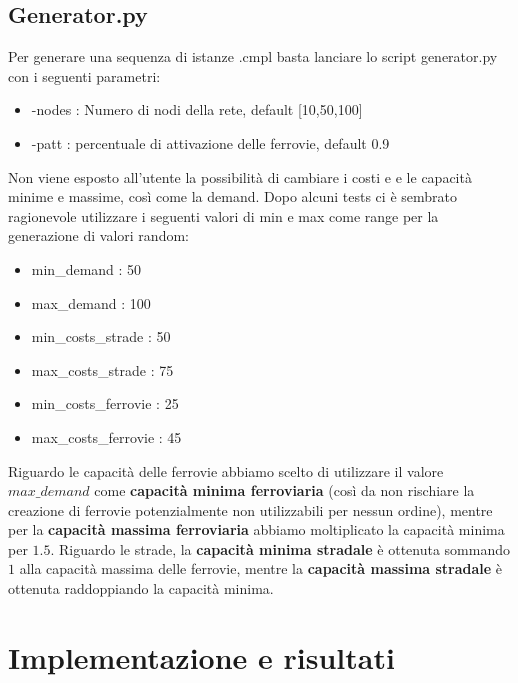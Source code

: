 \documentclass{article}
\begin{document}
\subsection{Generator.py}
Per generare una sequenza di istanze .cmpl basta lanciare lo script generator.py con i seguenti parametri:

\begin{itemize}
    \item -nodes : Numero di nodi della rete, default [10,50,100]
    \item -patt : percentuale di attivazione delle ferrovie, default 0.9
\end{itemize}
Non viene esposto all'utente la possibilità di cambiare i costi e e le capacità minime e massime, così come la demand. Dopo alcuni tests ci è sembrato ragionevole utilizzare i seguenti valori di min e max come range per la generazione di valori random:
\begin{itemize}
    \item min\_demand : 50
    \item max\_demand : 100
    \item min\_costs\_strade : 50
    \item max\_costs\_strade : 75
    \item min\_costs\_ferrovie : 25
    \item max\_costs\_ferrovie : 45
\end{itemize}

Riguardo le capacità delle ferrovie abbiamo scelto di utilizzare il valore $max\_demand$ come \textbf{capacità minima ferroviaria} (così da non rischiare la creazione di ferrovie potenzialmente non utilizzabili per nessun ordine), mentre per la \textbf{capacità massima ferroviaria} abbiamo moltiplicato la capacità minima per $1.5$. Riguardo le strade, la \textbf{capacità minima stradale} è ottenuta sommando $1$ alla capacità massima delle ferrovie, mentre la \textbf{capacità massima stradale} è ottenuta raddoppiando la capacità minima.



\section{Implementazione e risultati}

\end{document}
